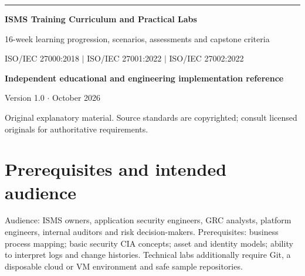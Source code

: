 \documentclass[11pt,letterpaper]{article}
\begin{document}
\begin{titlepage}
\vspace*{1.2in}
{\color{teal}\rule{\textwidth}{4pt}}\par\vspace{20pt}
{\Huge\bfseries\color{navy} ISMS Training Curriculum and Practical Labs}\par\vspace{18pt}
{\Large\color{graytext} 16-week learning progression, scenarios, assessments and capstone criteria}\par\vspace{1.3in}
{\large ISO/IEC 27000:2018 $\vert$ ISO/IEC 27001:2022 $\vert$ ISO/IEC 27002:2022}\par
\vfill
\textbf{Independent educational and engineering implementation reference}\par
Version 1.0 $\cdot$ October 2026\par
{\small Original explanatory material. Source standards are copyrighted; consult licensed originals for authoritative requirements.}\par
\end{titlepage}
\tableofcontents\clearpage{}
\section{Prerequisites and intended audience}
Audience: ISMS owners, application security engineers, GRC analysts, platform engineers, internal auditors and risk decision-makers. Prerequisites: business process mapping; basic security CIA concepts; asset and identity models; ability to interpret logs and change histories. Technical labs additionally require Git, a disposable cloud or VM environment and safe sample repositories.
\end{document}
